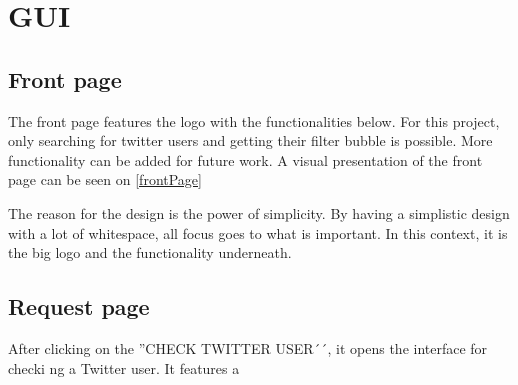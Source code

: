 \chapter{GUI} \label{GUI} 
\section{Front page}
The front page features the logo with the functionalities below. For this
project, only searching for twitter users and getting their filter bubble is
possible. More functionality can be added for future work. A visual presentation
of the front page can be seen on \autoref{frontPage}

{}

The reason for the design is the power of simplicity. By having a simplistic
design with a lot of whitespace, all focus goes to what is important. In this
context, it is the big logo and the functionality underneath.
\citep[p. 26 \& 32]{WebUI}

\section{Request page}
After clicking on the ''CHECK TWITTER USER´´, it opens the interface for checki
ng a Twitter user. It features a 
